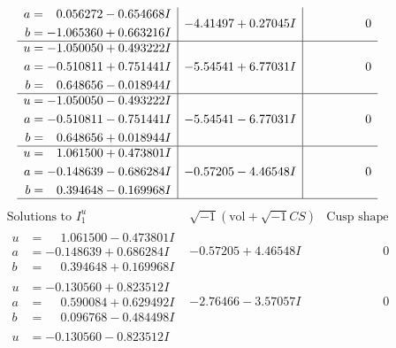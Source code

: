 \documentclass[1p]{elsarticle_modified}
\theoremstyle{definition}
\newcommand{\I}{\sqrt{-1}}
\begin{document}
$$\begin{array}{c|c|c}
\begin{aligned}
a &= \phantom{-}0.056272 - 0.654668 I \\
b &= -1.065360 + 0.663216 I\end{aligned}
 & -4.41497 + 0.27045 I & \phantom{-0.000000 } 0 \\ \hline\begin{aligned}
u &= -1.050050 + 0.493222 I \\
a &= -0.510811 + 0.751441 I \\
b &= \phantom{-}0.648656 - 0.018944 I\end{aligned}
 & -5.54541 + 6.77031 I & \phantom{-0.000000 } 0 \\ \hline\begin{aligned}
u &= -1.050050 - 0.493222 I \\
a &= -0.510811 - 0.751441 I \\
b &= \phantom{-}0.648656 + 0.018944 I\end{aligned}
 & -5.54541 - 6.77031 I & \phantom{-0.000000 } 0 \\ \hline\begin{aligned}
u &= \phantom{-}1.061500 + 0.473801 I \\
a &= -0.148639 - 0.686284 I \\
b &= \phantom{-}0.394648 - 0.169968 I\end{aligned}
 & -0.57205 - 4.46548 I & \phantom{-0.000000 } 0\\
 \hline 
 \end{array}$$\newpage$$\begin{array}{c|c|c}  
\text{Solutions to }I^u_{1}& \I (\text{vol} + \sqrt{-1}CS) & \text{Cusp shape}\\
 \hline 
\begin{aligned}
u &= \phantom{-}1.061500 - 0.473801 I \\
a &= -0.148639 + 0.686284 I \\
b &= \phantom{-}0.394648 + 0.169968 I\end{aligned}
 & -0.57205 + 4.46548 I & \phantom{-0.000000 } 0 \\ \hline\begin{aligned}
u &= -0.130560 + 0.823512 I \\
a &= \phantom{-}0.590084 + 0.629492 I \\
b &= \phantom{-}0.096768 - 0.484498 I\end{aligned}
 & -2.76466 - 3.57057 I & \phantom{-0.000000 } 0 \\ \hline\begin{aligned}
u &= -0.130560 - 0.823512 I \\

\end{aligned}
\end{array}$$
\end{document}
